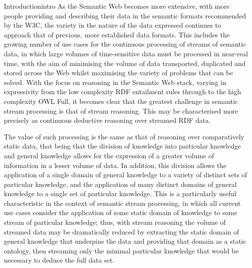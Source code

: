 \begin{nestedsection}{Introduction}{intro}
	As the Semantic Web becomes more extensive, with more people providing and describing their data in the semantic formats recommended by the W3C, the variety in the nature of the data expressed continues to approach that of previous, more established data formats.
	This includes the growing number of use cases for the continuous processing of streams of semantic data, in which large volumes of time-sensitive data must be processed in near-real time, with the aim of minimising the volume of data transported, duplicated and stored across the Web whilst maximising the variety of problems that can be solved.
	With the focus on reasoning in the Semantic Web stack, varying in expressivity from the low complexity RDF entailment rules through to the high complexity OWL Full, it becomes clear that the greatest challenge in semantic stream processing is that of stream reasoning.
	This may be characterised more precisely as continuous deductive reasoning over streamed RDF data.
	
	The value of such processing is the same as that of reasoning over comparatively static data, that being that the division of knowledge into particular knowledge and general knowledge allows for the expression of a greater volume of information in a lesser volume of data.
	In addition, this division allows the application of a single domain of general knowledge to a variety of distinct sets of particular knowledge, and the application of many distinct domains of general knowledge to a single set of particular knowledge.
	This is a particularly useful characteristic in the context of semantic stream processing, in which all current use cases consider the application of some static domain of knowledge to some stream of particular knowledge;
	thus, with stream reasoning the volume of streamed data may be dramatically reduced by extracting the static domain of general knowledge that underpins the data and providing that domain as a static ontology, then streaming only the minimal particular knowledge that would be necessary to deduce the full data set.


\end{nestedsection}
